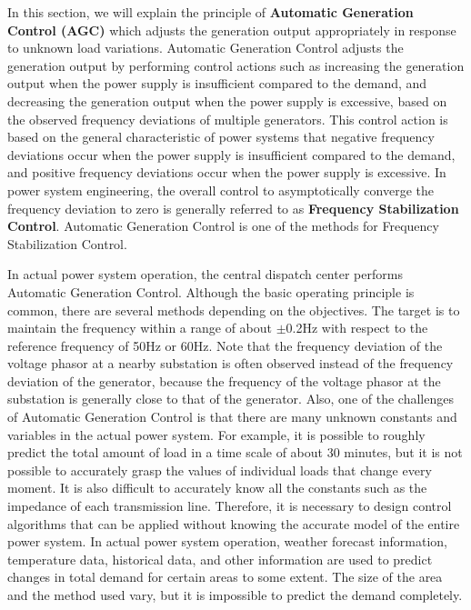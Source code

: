 \documentclass[graybox, envcountchap]{svmult}
\begin{document}
In this section, we will explain the principle of \textbf{Automatic Generation
Control (AGC)} which adjusts the generation
output appropriately in response to unknown load variations. Automatic
Generation Control adjusts the generation output by performing control actions
such as increasing the generation output when the power supply is insufficient
compared to the demand, and decreasing the generation output when the power
supply is excessive, based on the observed frequency deviations of multiple
generators. This control action is based on the general characteristic of power
systems that negative frequency deviations occur when the power supply is
insufficient compared to the demand, and positive frequency deviations occur
when the power supply is excessive. In power system engineering, the overall
control to asymptotically converge the frequency deviation to zero is generally
referred to as \textbf{Frequency Stabilization Control}.  Automatic Generation Control is one of the methods for
Frequency Stabilization Control.

In actual power system operation, the central dispatch center performs Automatic
Generation Control. Although the basic operating principle is common, there are
several methods depending on the objectives. The target is to maintain the
frequency within a range of about $\pm$0.2Hz with respect to the reference
frequency of 50Hz or 60Hz. Note that the frequency deviation of the voltage
phasor at a nearby substation is often observed instead of the frequency
deviation of the generator, because the frequency of the voltage phasor at the
substation is generally close to that of the generator. Also, one of the
challenges of Automatic Generation Control is that there are many unknown
constants and variables in the actual power system. For example, it is possible
to roughly predict the total amount of load in a time scale of about 30 minutes,
but it is not possible to accurately grasp the values of individual loads that
change every moment. It is also difficult to accurately know all the constants
such as the impedance of each transmission line. Therefore, it is necessary to
design control algorithms that can be applied without knowing the accurate model
of the entire power system. In actual power system operation, weather forecast
information, temperature data, historical data, and other information are used
to predict changes in total demand for certain areas to some extent. The size of
the area and the method used vary, but it is impossible to predict the demand
completely.
\end{document}
